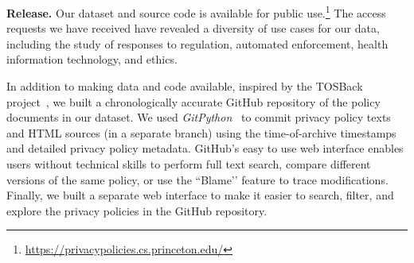 \textbf{Release.} Our dataset and source code is available for public use.\footnote{ \url{https://privacypolicies.cs.princeton.edu/}} The access requests we have received have revealed a diversity of use cases for our data, including the study of responses to regulation, automated enforcement, health information technology, and ethics.

In addition to making data and code available, inspired by the TOSBack project~\cite{TOSBack}, we built a chronologically accurate GitHub repository of the policy documents in our dataset.
We used \emph{GitPython}~\cite{GitPython} to commit privacy policy texts and HTML sources (in a separate branch) using the time-of-archive timestamps and detailed privacy policy metadata. 
GitHub’s easy to use web interface enables users without technical skills to perform full text search, compare different versions of the same policy, or use the ``Blame’’ feature to trace modifications.
Finally, we built a separate web interface
to make it easier to search, filter, and explore the privacy policies in the GitHub repository.
